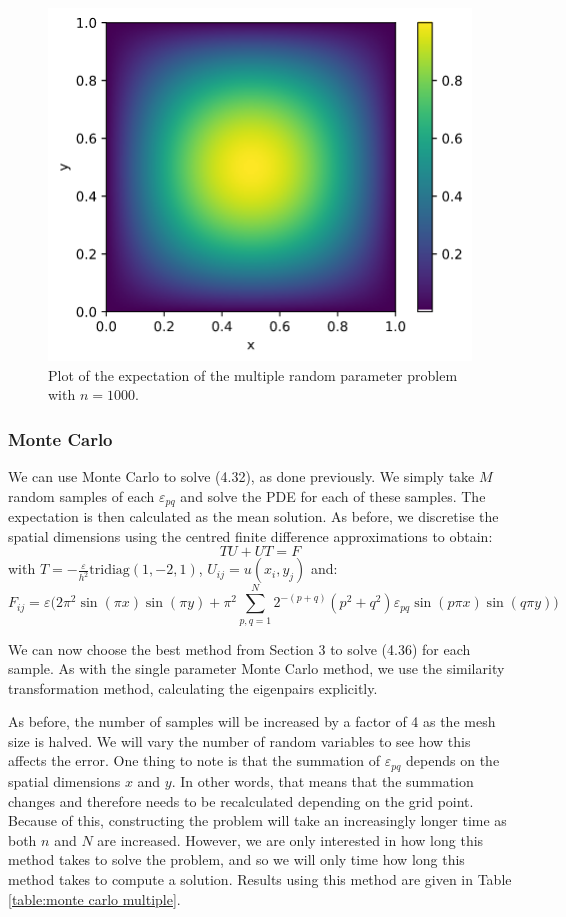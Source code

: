 \documentclass[11pt]{article}
\numberwithin{equation}{section}
\begin{document}
\begin{figure}[H]
\includegraphics[scale=.5]{img/solution2.png}
\centering
\caption{Plot of the expectation of the multiple random parameter problem with $n=1000$.}
\label{fig:multiple}
\end{figure} 

\subsubsection{Monte Carlo}
We can use Monte Carlo to solve (4.32), as done previously. We simply take $M$ random samples of each $\varepsilon_{pq}$ and solve the PDE for each of these samples. The expectation is then calculated as the mean solution. As before, we discretise the spatial dimensions using the centred finite difference approximations to obtain:
\begin{equation}
TU + UT = F
\end{equation}
with $T= -\frac{\varepsilon}{h^2}\text{tridiag}(1,-2,1)$, $U_{ij} = u(x_i,y_j)$ and: 
\[F_{ij}=\varepsilon \Big(2\pi^2 \sin(\pi x) \sin(\pi y) + \pi^2 \sum_{p,q=1}^N 2^{-(p+q)} (p^2 + q^2) \varepsilon_{pq} \sin(p \pi x)\sin(q \pi y) \Big) \]

We can now choose the best method from Section 3 to solve (4.36) for each sample. As with the single parameter Monte Carlo method, we use the similarity transformation method, calculating the eigenpairs explicitly. 

As before, the number of samples will be increased by a factor of 4 as the mesh size is halved. We will vary the number of random variables to see how this affects the error. One thing to note is that the summation of $\varepsilon_{pq}$ depends on the spatial dimensions $x$ and $y$. In other words, that means that the summation changes and therefore needs to be recalculated depending on the grid point. Because of this, constructing the problem will take an increasingly longer time as both $n$ and $N$ are increased. However, we are only interested in how long this method takes to solve the problem, and so we will only time how long this method takes to compute a solution. Results using this method are given in Table \ref{table:monte carlo multiple}.
\end{document}
